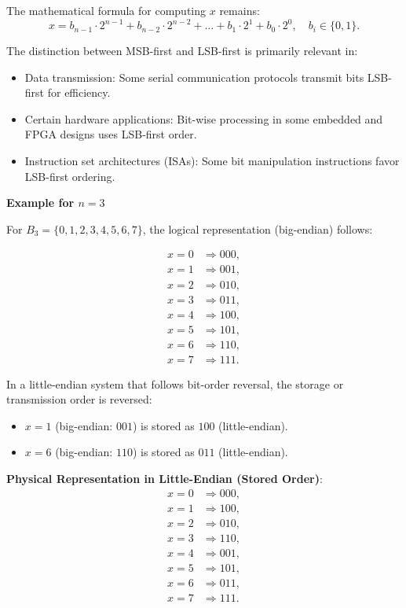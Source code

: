 The mathematical formula for computing \( x \) remains:
\[
x = b_{n-1} \cdot 2^{n-1} + b_{n-2} \cdot 2^{n-2} + \dots + b_1 \cdot 2^1 + b_0 \cdot 2^0, \quad b_i \in \{0, 1\}.
\]

The distinction between MSB-first and LSB-first is primarily relevant in:
\begin{itemize}
    \item Data transmission: Some serial communication protocols transmit bits LSB-first for efficiency.
    \item Certain hardware applications: Bit-wise processing in some embedded and FPGA designs uses LSB-first order.
    \item Instruction set architectures (ISAs): Some bit manipulation instructions favor LSB-first ordering.
\end{itemize}

\textbf{Example for \( n = 3 \)}  

For \( B_3 = \{0, 1, 2, 3, 4, 5, 6, 7\} \), the logical representation (big-endian) follows:

\[
\begin{aligned}
x = 0 & \Rightarrow 000, \\
x = 1 & \Rightarrow 001, \\
x = 2 & \Rightarrow 010, \\
x = 3 & \Rightarrow 011, \\
x = 4 & \Rightarrow 100, \\
x = 5 & \Rightarrow 101, \\
x = 6 & \Rightarrow 110, \\
x = 7 & \Rightarrow 111.
\end{aligned}
\]

In a little-endian system that follows bit-order reversal, the storage or transmission order is reversed:
\begin{itemize}
    \item \( x = 1 \) (big-endian: \( 001 \)) is stored as \( 100 \) (little-endian).
    \item \( x = 6 \) (big-endian: \( 110 \)) is stored as \( 011 \) (little-endian).
\end{itemize}


\textbf{Physical Representation in Little-Endian (Stored Order)}:
\[
\begin{aligned}
x = 0 & \Rightarrow 000, \\
x = 1 & \Rightarrow 100, \\
x = 2 & \Rightarrow 010, \\
x = 3 & \Rightarrow 110, \\
x = 4 & \Rightarrow 001, \\
x = 5 & \Rightarrow 101, \\
x = 6 & \Rightarrow 011, \\
x = 7 & \Rightarrow 111.
\end{aligned}
\]



